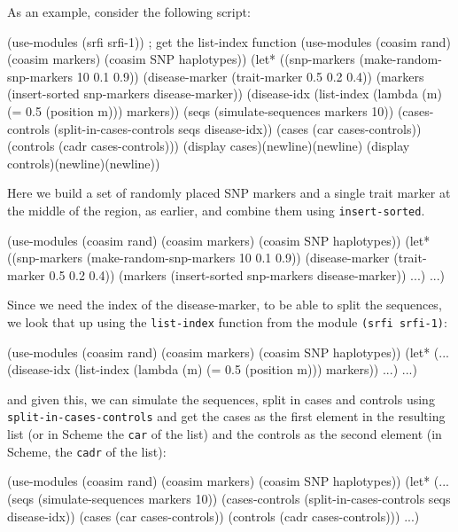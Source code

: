 \documentclass{manual}
\begin{document}
As an example, consider the following script:
\begin{code}
(use-modules (srfi srfi-1)) ; get the list-index function
(use-modules (coasim rand) (coasim markers) (coasim SNP haplotypes))
(let* ((snp-markers    (make-random-snp-markers 10 0.1 0.9))
       (disease-marker (trait-marker 0.5 0.2 0.4))
       (markers (insert-sorted snp-markers disease-marker))
       (disease-idx (list-index (lambda (m) (= 0.5 (position m))) markers))
       (seqs (simulate-sequences markers 10))
       (cases-controls (split-in-cases-controls seqs disease-idx))
       (cases (car cases-controls))
       (controls (cadr cases-controls)))
  (display cases)(newline)(newline)
  (display controls)(newline)(newline))
\end{code}
Here we build a set of randomly placed SNP markers and a single trait
marker at the middle of the region, as earlier, and combine them using
\texttt{insert-sorted}.
\begin{code}
(use-modules (coasim rand) (coasim markers) (coasim SNP haplotypes))
(let* ((snp-markers    (make-random-snp-markers 10 0.1 0.9))
       (disease-marker (trait-marker 0.5 0.2 0.4))
       (markers (insert-sorted snp-markers disease-marker))
       ...)
  ...)
\end{code}
Since we need the index of the disease-marker, to be able to split the
sequences, we look that up using the \texttt{list-index} function from
the module \texttt{(srfi srfi-1)}:
\begin{code}
(use-modules (coasim rand) (coasim markers) (coasim SNP haplotypes))
(let* (...
       (disease-idx (list-index (lambda (m) (= 0.5 (position m))) markers))
       ...)
  ...)
\end{code}
and given this, we can simulate the sequences, split in cases and
controls using \texttt{split-in-cases-controls} and get the cases as
the first element in the resulting list (or in Scheme the \texttt{car}
of the list) and the controls as the second element (in Scheme, the
\texttt{cadr} of the list):
\begin{code}
(use-modules (coasim rand) (coasim markers) (coasim SNP haplotypes))
(let* (...
       (seqs (simulate-sequences markers 10))
       (cases-controls (split-in-cases-controls seqs disease-idx))
       (cases (car cases-controls))
       (controls (cadr cases-controls)))
  ...)
\end{code}
\end{document}
